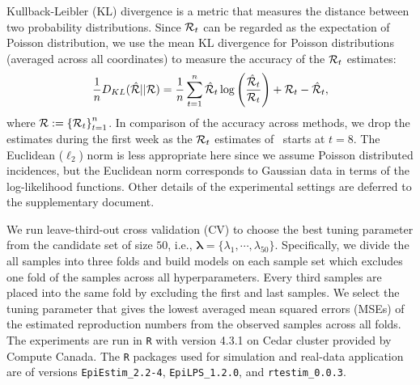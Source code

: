 Kullback-Leibler (KL) divergence is a metric that measures the distance between two probability distributions. Since $\mathcal{R}_t$ can be regarded as the expectation of Poisson distribution, we use the mean KL divergence for Poisson distributions (averaged across all coordinates) to measure the accuracy of the $\mathcal{R}_t$ estimates: 
$$\frac{1}{n} D_{KL}(\hat{\mathcal{R}}|| \mathcal{R}) = \frac{1}{n}\sum_{t=1}^n \hat{\mathcal{R}}_t \log\left(\frac{\hat{\mathcal{R}}_t}{\mathcal{R}_t}\right) + {\mathcal{R}}_t - \hat{\mathcal{R}}_t,$$ 
where $\mathcal{R} := \left\{ \mathcal{R}_t \right\}_{t=1}^n$. %
In comparison of the accuracy across methods, we drop the estimates during the first week as the $\mathcal{R}_t$ estimates of \EpiEstim\ starts at $t=8$.  
The Euclidean ($\ell_2$) norm is less appropriate here since we assume Poisson distributed incidences, but the Euclidean norm corresponds to Gaussian data in terms of the log-likelihood functions. 
Other details of the experimental settings are deferred to the supplementary document. 

We run leave-third-out cross validation (CV) to choose the best tuning parameter from the candidate set of size $50$, i.e., $\boldsymbol{\lambda} = \{\lambda_1, \cdots, \lambda_{50}\}$. Specifically, we divide the all samples into three folds and build models on each sample set which excludes one fold of the samples across all hyperparameters. Every third samples are placed into the same fold by excluding the first and last samples. We select the tuning parameter that gives the lowest averaged mean squared errors (MSEs) of the estimated reproduction numbers from the observed samples across all folds. 
The experiments are run in \texttt{R} with version 4.3.1 on Cedar cluster
provided by Compute Canada. The \texttt{R} packages used for simulation and
real-data application are of versions \texttt{EpiEstim\_2.2-4},
\texttt{EpiLPS\_1.2.0}, and \texttt{rtestim\_0.0.3}. 


